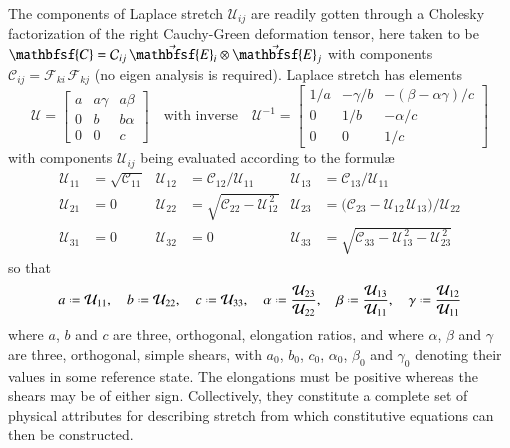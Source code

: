 The components of Laplace stretch $\mathcal{U}_{ij}$ are readily gotten through a Cholesky factorization of the right Cauchy-Green deformation tensor, here taken to be $\mathbfsf{C} = \mathcal{C}_{ij} \, \vec{\mathbfsf{E}}_i \otimes \vec{\mathbfsf{E}}_j$ with components $\mathcal{C}_{ij} = \mathcal{F}_{ki\,} \mathcal{F}_{kj}$ (no eigen analysis is required).  Laplace stretch has elements \cite{Freed17}
\begin{equation} 
\boldsymbol{\mathcal{U}} = 
\begin{bmatrix}
a & a \gamma & a \beta \\ 0 & b & b \alpha \\ 0 & 0 & c
\end{bmatrix} 
\quad \text{with inverse} \quad
\boldsymbol{\mathcal{U}}^{-1} = \begin{bmatrix}
1/a & -\gamma / b & -( \beta - \alpha\gamma ) / c \\
0 & 1/b & -\alpha / c \\
0 & 0 & 1/c
\end{bmatrix}
\label{LaplaceStretch3D}
\end{equation}
with components $\mathcal{U}_{ij}$ being evaluated according to the formul\ae\ \cite{Srinivasa12}
\begin{equation}
\begin{aligned}
\mathcal{U}_{11} & = \sqrt{\mathcal{C}_{11}} & 
\mathcal{U}_{12} & = \mathcal{C}_{12} / \mathcal{U}_{11} &
\mathcal{U}_{13} & = \mathcal{C}_{13} / \mathcal{U}_{11} \\
\mathcal{U}_{21} & = 0 &
\mathcal{U}_{22} & = \sqrt{\mathcal{C}_{22} - \mathcal{U}_{12}^{\,2}} &
\mathcal{U}_{23} & = \bigl( \mathcal{C}_{23} - 
\mathcal{U}_{12\,} \mathcal{U}_{13} \bigr) / \mathcal{U}_{22} \\
\mathcal{U}_{31} & = 0 &
\mathcal{U}_{32} & = 0 & 
\mathcal{U}_{33} & = \sqrt{\mathcal{C}_{33} - \mathcal{U}_{13}^{\,2} - 
    \mathcal{U}_{23}^{\,2}}
\end{aligned}
\label{LagrangianLaplaceStretch3D}
\end{equation}
so that
\begin{equation}
a \defeq \mathcal{U}_{11} , \quad
b \defeq \mathcal{U}_{22} , \quad
c \defeq \mathcal{U}_{33} , \quad
\alpha \defeq \frac{\mathcal{U}_{23}}{\mathcal{U}_{22}} , \quad
\beta \defeq \frac{\mathcal{U}_{13}}{\mathcal{U}_{11}} , \quad
\gamma \defeq \frac{\mathcal{U}_{12}}{\mathcal{U}_{11}}
\label{LagrangianPhysicalAttributes3D}
\end{equation}
where $a$, $b$ and $c$ are three, orthogonal, elongation ratios, and where $\alpha$, $\beta$ and $\gamma$ are three, orthogonal, simple shears, with $a_0$, $b_0$, $c_0$, $\alpha_0$, $\beta_0$ and $\gamma_0$ denoting their values in some reference state. The elongations must be positive whereas the shears may be of either sign. Collectively, they constitute a complete set of physical attributes for describing stretch from which constitutive equations can then be constructed.

